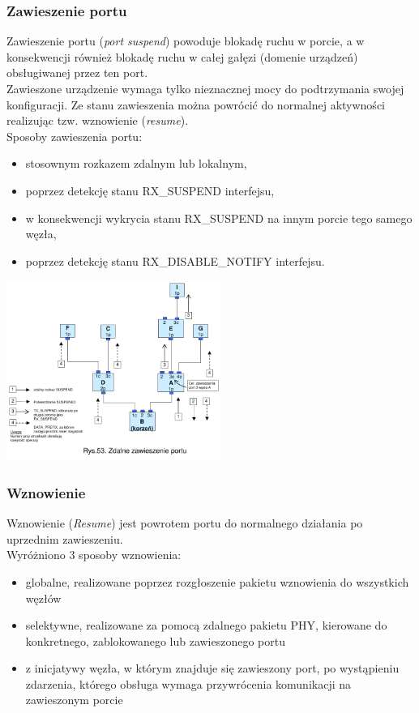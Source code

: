 \subsubsection{Zawieszenie portu}
Zawieszenie portu (\emph{port suspend}) powoduje blokadę ruchu w porcie, a w konsekwencji również blokadę ruchu w całej gałęzi (domenie urządzeń) obsługiwanej przez ten port.\\
Zawieszone urządzenie wymaga tylko nieznacznej mocy do podtrzymania swojej konfiguracji. Ze stanu zawieszenia można powrócić do normalnej aktywności realizując tzw. wznowienie (\emph{resume}).\\
Sposoby zawieszenia portu:
\begin{itemize}
	\item stosownym rozkazem zdalnym lub lokalnym,
	\item poprzez detekcję stanu RX\_SUSPEND interfejsu,
	\item w konsekwencji wykrycia stanu RX\_SUSPEND na innym porcie tego samego węzła,
	\item poprzez detekcję stanu RX\_DISABLE\_NOTIFY interfejsu.
\end{itemize}
\includegraphics[width=7cm]{./wyklady/FIREWIRE_70_1.pdf}
\subsubsection{Wznowienie}
Wznowienie (\emph{Resume}) jest powrotem portu do normalnego działania po uprzednim zawieszeniu.\\
Wyróżniono 3 sposoby wznowienia:
\begin{itemize}
	\item globalne, realizowane poprzez rozgłoszenie pakietu wznowienia do wszystkich węzłów
	\item selektywne, realizowane za pomocą zdalnego pakietu PHY, kierowane do konkretnego, zablokowanego lub zawieszonego portu
	\item z inicjatywy węzła, w którym znajduje się zawieszony port, po wystąpieniu zdarzenia, którego obsługa wymaga przywrócenia komunikacji na zawieszonym porcie
\end{itemize}

